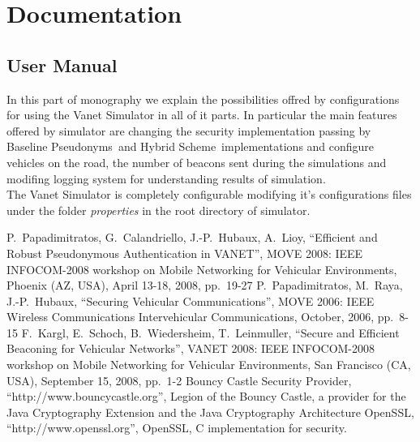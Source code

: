 \documentclass[a4paper,12pt]{article}
\def\baseline{Baseline Pseudonyms~}
\def\hybrid{Hybrid Scheme~}
\begin{document}
\section{Documentation}
\subsection{User Manual}
In this part of monography we explain the possibilities offred by configurations for using the Vanet Simulator in all of it parts. In particular the main features offered by simulator are changing the security implementation passing by \baseline and \hybrid implementations and configure vehicles on the road, the number of beacons sent during the simulations and modifing logging system for understanding results of simulation.\\
The Vanet Simulator is completely configurable modifying it's configurations files under the folder \textit{properties} in the root directory of simulator.

\begin{thebibliography}{99}\label{bibliography}
%
%
P.~Papadimitratos, G.~Calandriello, J.-P.~Hubaux, A.~Lioy,
``Efficient and Robust Pseudonymous Authentication in VANET'',
MOVE 2008: IEEE INFOCOM-2008 workshop on Mobile Networking for Vehicular Environments,
Phoenix (AZ, USA), April 13-18, 2008, pp.~19-27 
P.~Papadimitratos, M.~Raya, J.-P.~Hubaux,
``Securing Vehicular Communications'',
MOVE 2006: IEEE Wireless Communications Intervehicular Communications,
October, 2006, pp.~8-15 
F.~Kargl, E.~Schoch, B.~Wiedersheim, T.~Leinmuller,
``Secure and Efficient Beaconing for Vehicular Networks'',
VANET 2008: IEEE INFOCOM-2008 workshop on Mobile Networking for Vehicular Environments,
San Francisco (CA, USA), September 15, 2008, pp.~1-2 
Bouncy Castle Security Provider,
``http://www.bouncycastle.org'',
Legion of the Bouncy Castle, a provider for the Java Cryptography Extension and the Java Cryptography Architecture
OpenSSL,
``http://www.openssl.org'',
OpenSSL, C implementation for security.
\end{thebibliography}
\end{document}
